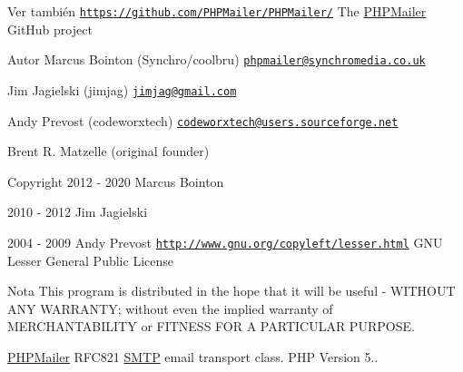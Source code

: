 \begin{DoxySeeAlso}{Ver también}
\href{https://github.com/PHPMailer/PHPMailer/}{\tt https\+://github.\+com/\+P\+H\+P\+Mailer/\+P\+H\+P\+Mailer/} The \hyperlink{classPHPMailer_1_1PHPMailer_1_1PHPMailer}{P\+H\+P\+Mailer} Git\+Hub project
\end{DoxySeeAlso}
\begin{DoxyAuthor}{Autor}
Marcus Bointon (Synchro/coolbru) \href{mailto:phpmailer@synchromedia.co.uk}{\tt phpmailer@synchromedia.\+co.\+uk} 

Jim Jagielski (jimjag) \href{mailto:jimjag@gmail.com}{\tt jimjag@gmail.\+com} 

Andy Prevost (codeworxtech) \href{mailto:codeworxtech@users.sourceforge.net}{\tt codeworxtech@users.\+sourceforge.\+net} 

Brent R. Matzelle (original founder) 
\end{DoxyAuthor}
\begin{DoxyCopyright}{Copyright}
2012 -\/ 2020 Marcus Bointon 

2010 -\/ 2012 Jim Jagielski 

2004 -\/ 2009 Andy Prevost  \href{http://www.gnu.org/copyleft/lesser.html}{\tt http\+://www.\+gnu.\+org/copyleft/lesser.\+html} G\+NU Lesser General Public License 
\end{DoxyCopyright}
\begin{DoxyNote}{Nota}
This program is distributed in the hope that it will be useful -\/ W\+I\+T\+H\+O\+UT A\+NY W\+A\+R\+R\+A\+N\+TY; without even the implied warranty of M\+E\+R\+C\+H\+A\+N\+T\+A\+B\+I\+L\+I\+TY or F\+I\+T\+N\+E\+SS F\+OR A P\+A\+R\+T\+I\+C\+U\+L\+AR P\+U\+R\+P\+O\+SE.
\end{DoxyNote}
\hyperlink{classPHPMailer_1_1PHPMailer_1_1PHPMailer}{P\+H\+P\+Mailer} R\+F\+C821 \hyperlink{classPHPMailer_1_1PHPMailer_1_1SMTP}{S\+M\+TP} email transport class. P\+HP Version 5..

